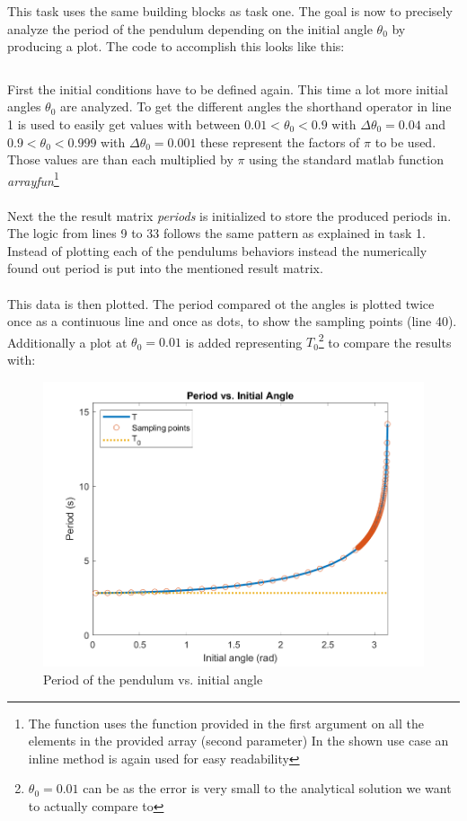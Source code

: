 \documentclass[14pt]{article}
\begin{document}
This task uses the same building blocks as task one. The goal is now to precisely analyze the period of the
pendulum depending on the initial angle $\theta_0$ by producing a plot. The code to accomplish this looks like this:

\inputminted[linenos]{octave}{./matlab/assignment_2.m}

First the initial conditions have to be defined again. This time a lot more initial angles $\theta_0$ are
analyzed. To get the different angles the shorthand operator in line 1 is used to easily get values with
between $ 0.01 < \theta_0 < 0.9$ with $\Delta \theta_0 = 0.04 $ and $ 0.9 < \theta_0 < 0.999$ with $\Delta \theta_0 = 0.001 $ these represent the factors
of $\pi$ to be used. Those values are than each multiplied by $\pi$ using the standard matlab function 
\textit{arrayfun}\footnote{The function uses the function provided in the first argument on all the elements in the provided array (second parameter)
In the shown use case an inline method is again used for easy readability}\\
\\
Next the the result matrix \textit{periods} is initialized to store the produced periods in. The logic from
lines 9 to 33 follows the same pattern as explained in task 1. Instead of plotting each of the pendulums
behaviors instead the numerically found out period is put into the mentioned result matrix.\\
\\
This data is then plotted. The period compared ot the angles is plotted twice once as a continuous line and
once as dots, to show the sampling points (line 40). Additionally a plot at $\theta_0 = 0.01$ is added representing $T_0$\footnote{$\theta_0 = 0.01$ can be 
as the error is very small to the analytical solution we want to actually compare to} to compare the results with:

\begin{figure}[H]
  \includegraphics[width=14cm]{./output/assignment2.png}
  \caption{Period of the pendulum vs. initial angle}
  \label{fig:figure6}
\end{figure}
\end{document}
